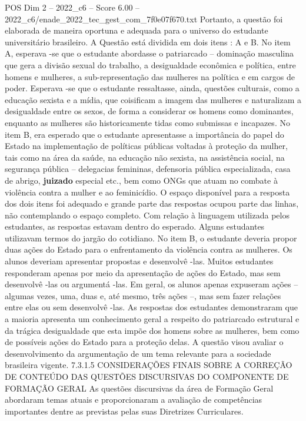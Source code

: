 \begin{textsample}{POS Dim 2 – 2022\_c6 – Score 6.00 – 2022\_c6/enade\_2022\_tec\_gest\_com\_7f0e07f670.txt}
Portanto, a questão foi elaborada de maneira oportuna e adequada para o universo do estudante universitário brasileiro.
A Questão está dividida em dois itens : A e B.
No item A, esperava -se que o estudante abordasse o patriarcado – dominação masculina que gera a divisão sexual do trabalho, a desigualdade econômica e política, entre homens e mulheres, a sub-representação das mulheres na política e em cargos de poder.
Esperava -se que o estudante ressaltasse, ainda, questões culturais, como a educação sexista e a mídia, que coisificam a imagem das mulheres e naturalizam a desigualdade entre os sexos, de forma a considerar os homens como dominantes, enquanto as mulheres são historicamente tidas como submissas e incapazes.
No item B, era esperado que o estudante apresentasse a importância do papel do Estado na implementação de políticas públicas voltadas à proteção da mulher, tais como na área da saúde, na educação não sexista, na assistência social, na segurança pública – delegacias femininas, defensoria pública especializada, casa de abrigo, \textbf{juizado} especial etc., bem como ONGs que atuam no combate à violência contra a mulher e ao feminicídio.
O espaço disponível para a resposta dos dois itens foi adequado e grande parte das respostas ocupou parte das linhas, não contemplando o espaço completo.
Com relação à linguagem utilizada pelos estudantes, as respostas estavam dentro do esperado.
Alguns estudantes utilizavam termos do jargão do cotidiano.
No item B, o estudante deveria propor duas ações do Estado para o enfrentamento da violência contra as mulheres.
Os alunos deveriam apresentar propostas e desenvolvê -las.
Muitos estudantes responderam apenas por meio da apresentação de ações do Estado, mas sem desenvolvê -las ou argumentá -las.
Em geral, os alunos apenas expuseram ações – algumas vezes, uma, duas e, até mesmo, três ações –, mas sem fazer relações entre elas ou sem desenvolvê -las.
As respostas dos estudantes demonstraram que a maioria apresenta um conhecimento geral a respeito do patriarcado estrutural e da trágica desigualdade que esta impõe dos homens sobre as mulheres, bem como de possíveis ações do Estado para a proteção delas.
A questão visou avaliar o desenvolvimento da argumentação de um tema relevante para a sociedade brasileira vigente. 7.3.1.5 CONSIDERAÇÕES FINAIS SOBRE A CORREÇÃO DE CONTEÚDO DAS QUESTÕES DISCURSIVAS DO COMPONENTE DE FORMAÇÃO GERAL As questões discursivas da área de Formação Geral abordaram temas atuais e proporcionaram a avaliação de competências importantes dentre as previstas pelas suas Diretrizes Curriculares.

\end{textsample}
